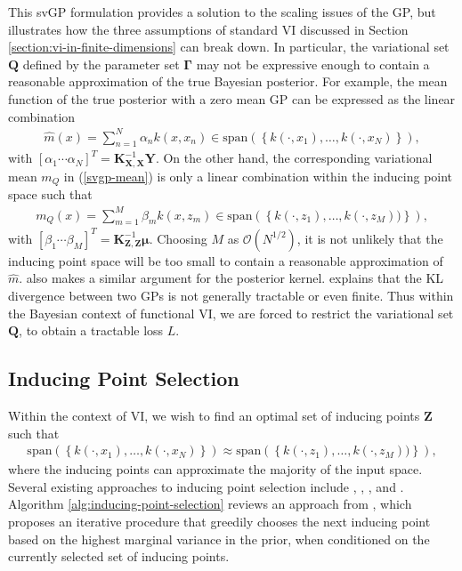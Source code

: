 \documentclass{article}
\numberwithin{equation}{section}
\begin{document}
This svGP formulation provides a solution to the scaling issues of the GP, but illustrates how the three assumptions of standard VI discussed in Section \ref{section:vi-in-finite-dimensions} can break down.
In particular, the variational set $\mathbf{Q}$ defined by the parameter set $\boldsymbol{\Gamma}$ may not be expressive enough to contain a reasonable approximation of the true Bayesian posterior.
For example, the mean function of the true posterior with a zero mean GP can be expressed as the linear combination
\begin{align}
    \hat{m}(x) = \sum_{n=1}^{N} \alpha_n k(x, x_n) \in \text{span} \left(\left\{k(\cdot, x_1), \dots, k(\cdot, x_N)\right\}\right),
\end{align}
with $\left[\alpha_1 \cdots \alpha_N\right]^T = \mathbf{K}_{\mathbf{X}, \mathbf{X}}^{-1}\mathbf{Y}$.
On the other hand, the corresponding variational mean $m_Q$ in (\ref{svgp-mean}) is only a linear combination within the inducing point space such that
\begin{align}
    m_Q(x) = \sum_{m=1}^{M} \beta_m k(x, z_m) \in \text{span}\left(\left\{k(\cdot, z_1), \dots, k(\cdot, z_M))\right\}\right),
\end{align}
with $\left[\beta_1 \cdots \beta_M\right]^T = \mathbf{K}_{\mathbf{Z}, \mathbf{Z}}^{-1}\boldsymbol{\mu}$.
Choosing $M$ as $\mathcal{O}(N^{1/2})$, it is not unlikely that the inducing point space will be too small to contain a reasonable approximation of $\hat{m}$.
\cite{wild2021connections} also makes a similar argument for the posterior kernel.
\cite{burt2020understanding} explains that the KL divergence between two GPs is not generally tractable or even finite.
Thus within the Bayesian context of functional VI, we are forced to restrict the variational set $\boldsymbol{Q}$, to obtain a tractable loss $L$.

\subsection{Inducing Point Selection}\label{section:inducing-point-selection}
Within the context of VI, we wish to find an optimal set of inducing points $\mathbf{Z}$ such that
\begin{align}
    \text{span} \left(\left\{k(\cdot, x_1), \dots, k(\cdot, x_N)\right\}\right) \approx \text{span}\left(\left\{k(\cdot, z_1), \dots, k(\cdot, z_M))\right\}\right),
    \label{inducing-point-input-space}
\end{align}
where the inducing points can approximate the majority of the input space. 
Several existing approaches to inducing point selection include \cite{smola2000sparse}, \cite{hensman2015scalable}, \cite{li2016fast}, and \cite{alaoui2015fast}.
Algorithm \ref{alg:inducing-point-selection} reviews an approach from \cite{burt2020convergence}, which proposes an iterative procedure that greedily chooses the next inducing point based on the highest marginal variance in the prior, when conditioned on the currently selected set of inducing points.
\end{document}
